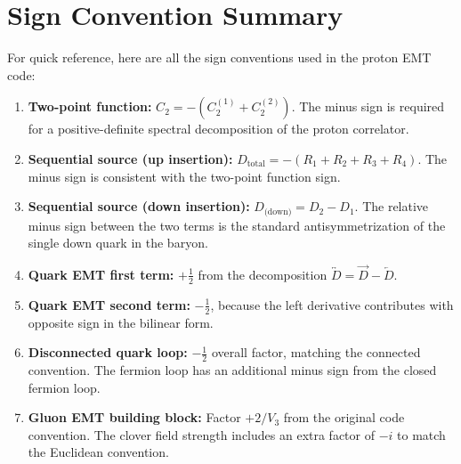 \documentclass[11pt,a4paper]{article}
\begin{document}
\section{Sign Convention Summary}

For quick reference, here are all the sign conventions used in the proton EMT code:

\begin{enumerate}
  \item \textbf{Two-point function:}
        $C_{2} = -(C_{2}^{(1)} + C_{2}^{(2)})$.  The minus sign is required for
        a positive-definite spectral decomposition of the proton correlator.

  \item \textbf{Sequential source (up insertion):}
        $D_{\text{total}} = -(R_{1} + R_{2} + R_{3} + R_{4})$.  The minus sign
        is consistent with the two-point function sign.

  \item \textbf{Sequential source (down insertion):}
        $D_{\text{(down)}} = D_{2} - D_{1}$.  The relative minus sign between the
        two terms is the standard antisymmetrization of the single down quark in
        the baryon.

  \item \textbf{Quark EMT first term:}
        $+\frac{1}{2}$ from the decomposition $\overleftrightarrow{D} =
        \overrightarrow{D} - \overleftarrow{D}$.

  \item \textbf{Quark EMT second term:}
        $-\frac{1}{2}$, because the left derivative contributes with opposite sign
        in the bilinear form.

  \item \textbf{Disconnected quark loop:}
        $-\frac{1}{2}$ overall factor, matching the connected convention.
        The fermion loop has an additional minus sign from the closed fermion loop.

  \item \textbf{Gluon EMT building block:}
        Factor $+2/V_{3}$ from the original code convention.  The clover field
        strength includes an extra factor of $-i$ to match the Euclidean convention.
\end{enumerate}


\end{document}
